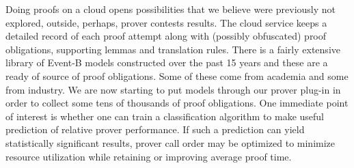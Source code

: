 \documentclass{llncs}
\begin{document}
Doing proofs on a cloud opens possibilities that we believe were previously not explored, outside, perhaps, prover contests results. The cloud service keeps a detailed record of each proof attempt along with (possibly obfuscated) proof obligations, supporting lemmas and translation rules. There is a fairly extensive library of Event-B models constructed over the past 15 years and these are a ready of source of proof obligations. Some of these come from academia and some from industry. We are now starting to put models through our prover plug-in in order to collect some tens of thousands of proof obligations. One immediate point of interest is whether one can train a classification algorithm to make useful prediction of relative prover performance. If such a prediction can yield statistically significant results, prover call order may be optimized to minimize resource utilization while retaining or improving average proof time. 







\end{document}
